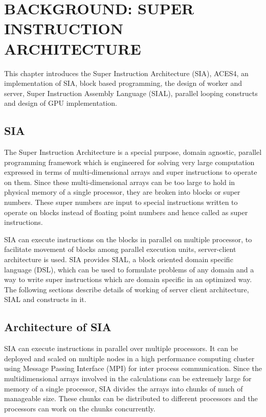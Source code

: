 \chapter{BACKGROUND: SUPER INSTRUCTION ARCHITECTURE} \label{background}

This chapter introduces the Super Instruction Architecture (SIA), ACES4, an
implementation of SIA, block based programming, the design of worker and server,
Super Instruction Assembly Language (SIAL), parallel looping constructs and
design of GPU implementation.

\section{SIA}
The Super Instruction Architecture is a special purpose, domain agnostic,
parallel programming framework which is engineered for solving very large
computation expressed in terms of multi-dimensional arrays and super
instructions to operate on them. Since these multi-dimensional arrays can be too
large to hold in physical memory of a single processor, they are broken into
blocks or super numbers. These super numbers are input to special instructions
written to operate on blocks instead of floating point numbers and hence called
as super instructions.

SIA can execute instructions on the blocks in parallel on multiple processor, to
facilitate movement of blocks among parallel execution units, server-client
architecture is used. SIA provides SIAL, a block oriented domain specific
language (DSL), which can be used to formulate problems of any domain and a way
to write super instructions which are domain specific in an optimized way. The
following sections describe details of working of server client architecture,
SIAL and constructs in it.

\section{Architecture of SIA}
SIA can execute instructions in parallel over multiple processors. It can be
deployed and scaled on multiple nodes in a high performance computing cluster
using Message Passing Interface (MPI) for inter process communication. Since the
multidimensional arrays involved in the calculations can be extremely large for
memory of a single processor, SIA divides the arrays into chunks of much of
manageable size. These chunks can be distributed to different processors and the
processors can work on the chunks concurrently.

